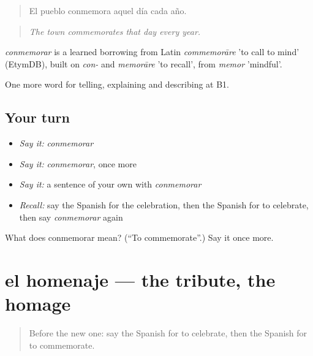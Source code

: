 \begin{quote}
El pueblo conmemora aquel día cada año.
\end{quote}

\begin{quote}
\emph{The town commemorates that day every year.}
\end{quote}

\begin{cousinweb}
\emph{conmemorar} is a learned borrowing from Latin \emph{commemorāre} 'to call to mind' (EtymDB), built on \emph{con-} and \emph{memorāre} 'to recall', from \emph{memor} 'mindful'.
\end{cousinweb}

\begin{grammarlens}[title={What you've built}]
One more word for telling, explaining and describing at B1.
\end{grammarlens}

\subsection*{Your turn}
\begin{itemize}
\raggedright
  \item \emph{Say it:} \emph{conmemorar}
  \item \emph{Say it:} \emph{conmemorar}, once more
  \item \emph{Say it:} a sentence of your own with \emph{conmemorar}
  \item \emph{Recall:} say the Spanish for the celebration, then the Spanish for to celebrate, then say \emph{conmemorar} again
\end{itemize}

\begin{tcolorbox}[breakable,colback=teal!4,colframe=teal!35!black,title={Before you move on}]
What does conmemorar mean? (\textquotedblleft{}To commemorate\textquotedblright{}.) Say it once more.
\end{tcolorbox}
\section[el homenaje]{el homenaje — the tribute, the homage}

\label{lesson:ES-C558-homenaje}



\begin{quote}
Before the new one: say the Spanish for to celebrate, then the Spanish for to commemorate.
\end{quote}

